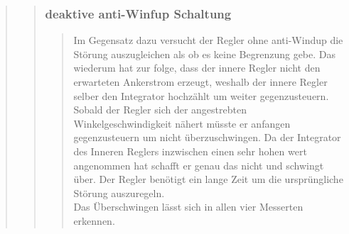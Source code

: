 \begin{quote}
\begin{quote}
\begin{quote}
		\end{quote}
		
		\subsubsection{deaktive anti-Winfup Schaltung}
		\begin{quote}
            Im Gegensatz dazu versucht der Regler ohne anti-Windup die Störung auszugleichen als ob es keine
            Begrenzung gebe. Das wiederum hat zur folge, dass der innere Regler nicht den erwarteten Ankerstrom erzeugt,
            weshalb der innere Regler selber den Integrator hochzählt um weiter gegenzusteuern.\\
            Sobald der Regler sich der angestrebten Winkelgeschwindigkeit nähert müsste er anfangen gegenzusteuern
            um nicht überzuschwingen. Da der Integrator des Inneren Reglers inzwischen einen sehr hohen wert angenommen hat
            schafft er genau das nicht und schwingt über. Der Regler benötigt ein lange Zeit um die ursprüngliche Störung
            auszuregeln.\\
            Das Überschwingen lässt sich in allen vier Messerten erkennen.			
		\end{quote}
                        
    \end{quote}


    
    
    
    
\end{quote}




%     
%         


